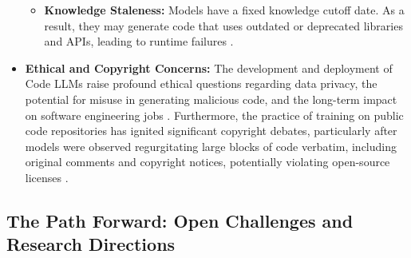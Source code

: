 \documentclass[12pt, a4paper]{report}
\begin{document}
\begin{itemize}
\begin{itemize}
        \item \textbf{Knowledge Staleness:} Models have a fixed knowledge cutoff date. As a result, they may generate code that uses outdated or deprecated libraries and APIs, leading to runtime failures \citep{zhao2023survey}.
    \end{itemize}
    \item \textbf{Ethical and Copyright Concerns:} The development and deployment of Code LLMs raise profound ethical questions regarding data privacy, the potential for misuse in generating malicious code, and the long-term impact on software engineering jobs \citep{weidinger2021ethical}. Furthermore, the practice of training on public code repositories has ignited significant copyright debates, particularly after models were observed regurgitating large blocks of code verbatim, including original comments and copyright notices, potentially violating open-source licenses \citep{chen2021evaluating}.
\end{itemize}

\subsection{The Path Forward: Open Challenges and Research Directions}
\end{document}
